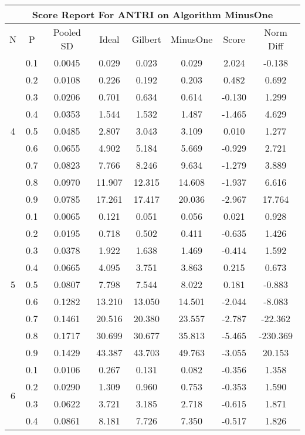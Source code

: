 \documentclass[11pt,a4paper]{report}
\begin{document}
\begin{longtable}{ | c | c || c | c | c | c | c | c | }
\hline
\multicolumn{8}{|c|}{ Score Report For ANTRI on Algorithm MinusOne} \\
\hline
N & P & Pooled SD &  Ideal &  Gilbert & MinusOne  & Score & Norm Diff \\
 \hline
 \hline
 \endhead
\multirow{9}{*}{4} & 0.1 & 0.0045 & 0.029 & 0.023 & 0.029 & 2.024 & -0.138 \\
 & 0.2 & 0.0108 & 0.226 & 0.192 & 0.203 & 0.482 & 0.692 \\
 & 0.3 & 0.0206 & 0.701 & 0.634 & 0.614 & -0.130 & 1.299 \\
 & 0.4 & 0.0353 & 1.544 & 1.532 & 1.487 & -1.465 & 4.629 \\
 & 0.5 & 0.0485 & 2.807 & 3.043 & 3.109 & 0.010 & 1.277 \\
 & 0.6 & 0.0655 & 4.902 & 5.184 & 5.669 & -0.929 & 2.721 \\
 & 0.7 & 0.0823 & 7.766 & 8.246 & 9.634 & -1.279 & 3.889 \\
 & 0.8 & 0.0970 & 11.907 & 12.315 & 14.608 & -1.937 & 6.616 \\
 & 0.9 & 0.0785 & 17.261 & 17.417 & 20.036 & -2.967 & 17.764 \\
 \hline
\multirow{9}{*}{5} & 0.1 & 0.0065 & 0.121 & 0.051 & 0.056 & 0.021 & 0.928 \\
 & 0.2 & 0.0195 & 0.718 & 0.502 & 0.411 & -0.635 & 1.426 \\
 & 0.3 & 0.0378 & 1.922 & 1.638 & 1.469 & -0.414 & 1.592 \\
 & 0.4 & 0.0665 & 4.095 & 3.751 & 3.863 & 0.215 & 0.673 \\
 & 0.5 & 0.0807 & 7.798 & 7.544 & 8.022 & 0.181 & -0.883 \\
 & 0.6 & 0.1282 & 13.210 & 13.050 & 14.501 & -2.044 & -8.083 \\
 & 0.7 & 0.1461 & 20.516 & 20.380 & 23.557 & -2.787 & -22.362 \\
 & 0.8 & 0.1717 & 30.699 & 30.677 & 35.813 & -5.465 & -230.369 \\
 & 0.9 & 0.1429 & 43.387 & 43.703 & 49.763 & -3.055 & 20.153 \\
 \hline
\multirow{9}{*}{6} & 0.1 & 0.0106 & 0.267 & 0.131 & 0.082 & -0.356 & 1.358 \\
 & 0.2 & 0.0290 & 1.309 & 0.960 & 0.753 & -0.353 & 1.590 \\
 & 0.3 & 0.0622 & 3.721 & 3.185 & 2.718 & -0.615 & 1.871 \\
 & 0.4 & 0.0861 & 8.181 & 7.726 & 7.350 & -0.517 & 1.826 \\

\end{longtable}
\end{document}
